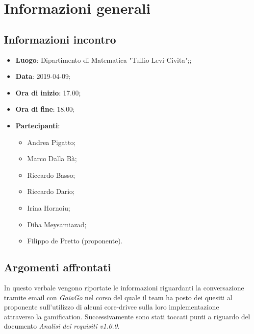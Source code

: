 \section{Informazioni generali}

\subsection{Informazioni incontro}
\begin{itemize}
\item \textbf{Luogo}: Dipartimento di Matematica "Tullio Levi-Civita";;
\item \textbf{Data}: 2019-04-09;
\item \textbf{Ora di inizio}: 17.00;
\item \textbf{Ora di fine}: 18.00;
\item \textbf{Partecipanti}: 
\begin{itemize}
	\item Andrea Pigatto;
	\item Marco Dalla Bà;
	\item Riccardo Basso;
	\item Riccardo Dario;
	\item Irina Hornoiu;
	\item Diba Meysamiazad;
	\item Filippo de Pretto (proponente).
\end{itemize}
\end{itemize}

\subsection{Argomenti affrontati}
In questo verbale vengono riportate le informazioni riguardanti la conversazione tramite email con \textit{GaiaGo} nel corso del quale il team ha posto dei quesiti al proponente sull'utilizzo di alcuni core-drive\glosp e sulla loro implementazione attraverso la gamification\glo. Successivamente sono stati toccati punti a riguardo del documento \textit{Analisi dei requisiti v1.0.0}.
